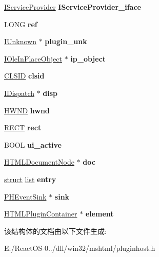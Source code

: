 \begin{DoxyCompactItemize}
\hyperlink{interface_i_service_provider}{I\+Service\+Provider} {\bfseries I\+Service\+Provider\+\_\+iface}
\item 
\mbox{\label{struct_plugin_host_acc9f6ff234640fea0d62270622133fb9}} 
L\+O\+NG {\bfseries ref}
\item 
\mbox{\label{struct_plugin_host_a9e8a88788914b69add47d840688b7f22}} 
\hyperlink{interface_i_unknown}{I\+Unknown} $\ast$ {\bfseries plugin\+\_\+unk}
\item 
\mbox{\label{struct_plugin_host_ac920c62836baf41ae39d331745f6504e}} 
\hyperlink{interface_i_ole_in_place_object}{I\+Ole\+In\+Place\+Object} $\ast$ {\bfseries ip\+\_\+object}
\item 
\mbox{\label{struct_plugin_host_a255daa38073650c8f88554b2fa0559ed}} 
\hyperlink{struct___i_i_d}{C\+L\+S\+ID} {\bfseries clsid}
\item 
\mbox{\label{struct_plugin_host_af6756bed478e79a4df2a0612d9cf0042}} 
\hyperlink{interface_i_dispatch}{I\+Dispatch} $\ast$ {\bfseries disp}
\item 
\mbox{\label{struct_plugin_host_a19d8f7dde45a11a2041ff0ccbc7253b5}} 
\hyperlink{interfacevoid}{H\+W\+ND} {\bfseries hwnd}
\item 
\mbox{\label{struct_plugin_host_adcdfb1a7a72c6436de4fca4ad30f4354}} 
\hyperlink{structtag_r_e_c_t}{R\+E\+CT} {\bfseries rect}
\item 
\mbox{\label{struct_plugin_host_a1d53c25b466dcfbfb8e922f82d9db38f}} 
B\+O\+OL {\bfseries ui\+\_\+active}
\item 
\mbox{\label{struct_plugin_host_a2060bfecbe1e123980c802709fef2ca7}} 
\hyperlink{struct_h_t_m_l_document_node}{H\+T\+M\+L\+Document\+Node} $\ast$ {\bfseries doc}
\item 
\mbox{\label{struct_plugin_host_ac309e0c3d20f2cef64a230c35e18bc73}} 
\hyperlink{interfacestruct}{struct} \hyperlink{classlist}{list} {\bfseries entry}
\item 
\mbox{\label{struct_plugin_host_a3ab436003df26a8f67daa186c4d65633}} 
\hyperlink{struct_p_h_event_sink}{P\+H\+Event\+Sink} $\ast$ {\bfseries sink}
\item 
\mbox{\label{struct_plugin_host_a3ba6287e6132e9ad671a19bd743196c0}} 
\hyperlink{struct_h_t_m_l_plugin_container}{H\+T\+M\+L\+Plugin\+Container} $\ast$ {\bfseries element}
\end{DoxyCompactItemize}


该结构体的文档由以下文件生成\+:\begin{DoxyCompactItemize}
\item 
E\+:/\+React\+O\+S-\/0../dll/win32/mshtml/pluginhost.\+h\end{DoxyCompactItemize}

